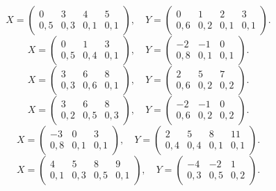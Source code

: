 $$ X = \left(\begin{array}{*{4}{c}} 0 & 3 & 4 & 5 \\ 0{,}5 & 0{,}3 & 0{,}1 & 0{,}1 \end{array}\right), \quad Y = \left(\begin{array}{*{4}{c}} 0 & 1 & 2 & 3 \\ 0{,}6 & 0{,}2 & 0{,}1 & 0{,}1 \end{array}\right). $$
$$ X = \left(\begin{array}{*{3}{c}} 0 & 1 & 3 \\ 0{,}5 & 0{,}4 & 0{,}1 \end{array}\right), \quad Y = \left(\begin{array}{*{3}{c}} -2 & -1 & 0 \\ 0{,}8 & 0{,}1 & 0{,}1 \end{array}\right). $$
$$ X = \left(\begin{array}{*{3}{c}} 3 & 6 & 8 \\ 0{,}3 & 0{,}6 & 0{,}1 \end{array}\right), \quad Y = \left(\begin{array}{*{3}{c}} 2 & 5 & 7 \\ 0{,}6 & 0{,}2 & 0{,}2 \end{array}\right). $$
$$ X = \left(\begin{array}{*{3}{c}} 3 & 6 & 8 \\ 0{,}2 & 0{,}5 & 0{,}3 \end{array}\right), \quad Y = \left(\begin{array}{*{3}{c}} -2 & -1 & 0 \\ 0{,}6 & 0{,}2 & 0{,}2 \end{array}\right). $$
$$ X = \left(\begin{array}{*{3}{c}} -3 & 0 & 3 \\ 0{,}8 & 0{,}1 & 0{,}1 \end{array}\right), \quad Y = \left(\begin{array}{*{4}{c}} 2 & 5 & 8 & 11 \\ 0{,}4 & 0{,}4 & 0{,}1 & 0{,}1 \end{array}\right). $$
$$ X = \left(\begin{array}{*{4}{c}} 4 & 5 & 8 & 9 \\ 0{,}1 & 0{,}3 & 0{,}5 & 0{,}1 \end{array}\right), \quad Y = \left(\begin{array}{*{3}{c}} -4 & -2 & 1 \\ 0{,}3 & 0{,}5 & 0{,}2 \end{array}\right). $$
